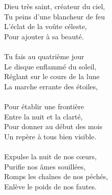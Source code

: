 Dieu très saint, créateur du ciel,\\
Tu peins d’une blancheur de feu\\
L’éclat de la voûte céleste,\\
Pour ajouter à sa beauté.\\
\\
Tu fais au quatrième jour\\
Le disque enflammé du soleil,\\
Réglant sur le cours de la lune\\
La marche errante des étoiles,\\
\\
Pour établir une frontière\\
Entre la nuit et la clarté,\\
Pour donner au début des mois\\
Un repère à tous bien visible.\\
\\
Expulse la nuit de nos cœurs,\\
Purifie nos âmes souillées,\\
Romps les chaînes de nos péchés,\\
Enlève le poids de nos fautes.